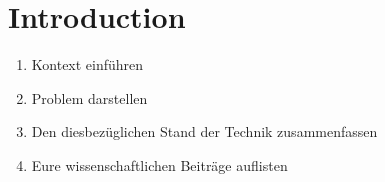 \section{Introduction}

\begin{enumerate}
	\item Kontext einführen
	\item Problem darstellen
	\item Den diesbezüglichen Stand der Technik zusammenfassen
	\item Eure wissenschaftlichen Beiträge auflisten
\end{enumerate}
